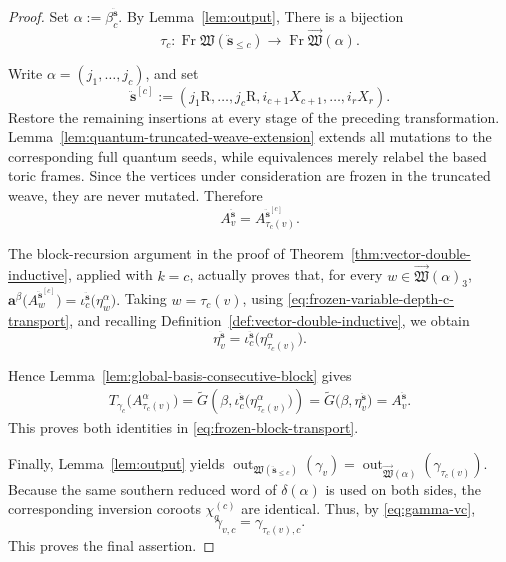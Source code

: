 \documentclass[12pt, reqno]{amsart}
\theoremstyle{plain}
\theoremstyle{definition}
\numberwithin{equation}{section}
\begin{document}
\begin{proof}
Set
\(
    \alpha:=\beta_c^{\ddot{\mathbf s}}.
\)
By Lemma~\ref{lem:output}, There is a bijection
\[
    \tau_c\colon
    \operatorname{Fr}\mathfrak W(\ddot{\mathbf s}_{\leq c})
    \longrightarrow
    \operatorname{Fr}\overrightarrow{\mathfrak W}(\alpha).
\]


Write \(\alpha=(j_1,\ldots,j_c)\), and set
\[
    \ddot{\mathbf s}^{[c]}
    :=
    (j_1\mathrm R,\ldots,j_c\mathrm R,
      i_{c+1}X_{c+1},\ldots,i_rX_r).
\]
Restore the remaining insertions at every stage of the preceding
transformation. Lemma~\ref{lem:quantum-truncated-weave-extension}
extends all mutations to the corresponding full quantum seeds,
while equivalences merely relabel the based toric frames. Since the
vertices under consideration are frozen in the truncated weave,
they are never mutated. Therefore
\begin{equation}\label{eq:frozen-variable-depth-c-transport}
    A_v^{\ddot{\mathbf s}}
    =
    A_{\tau_c(v)}^{\ddot{\mathbf s}^{[c]}}.
\end{equation}

The block-recursion argument in the proof of
Theorem~\ref{thm:vector-double-inductive}, applied with \(k=c\),
actually proves that, for every
\(w\in\overrightarrow{\mathfrak W}(\alpha)_3\),
\(    \mathbf a^\beta
       \bigl(A_w^{\ddot{\mathbf s}^{[c]}}\bigr)
    =
    \iota_c^{\ddot{\mathbf s}}
       \bigl(\eta_w^\alpha\bigr).
\)
Taking \(w=\tau_c(v)\), using
\eqref{eq:frozen-variable-depth-c-transport}, and recalling
Definition~\ref{def:vector-double-inductive}, we obtain
\[
    \eta_v^{\ddot{\mathbf s}}
    =
    \iota_c^{\ddot{\mathbf s}}
       \bigl(\eta_{\tau_c(v)}^\alpha\bigr).
\]

Hence Lemma~\ref{lem:global-basis-consecutive-block} gives
\[
\begin{aligned}
    T_{\gamma_c}
       \bigl(A_{\tau_c(v)}^\alpha\bigr)
    =
    \widetilde G\left(
       \beta,
       \iota_c^{\ddot{\mathbf s}}
          \bigl(\eta_{\tau_c(v)}^\alpha\bigr)
    \right)
    =
    \widetilde G
       \bigl(\beta,\eta_v^{\ddot{\mathbf s}}\bigr)
     =
    A_v^{\ddot{\mathbf s}}.
\end{aligned}
\]
This proves both identities in
\eqref{eq:frozen-block-transport}.

Finally, Lemma~\ref{lem:output} yields
\(
 \operatorname{out}_{\mathfrak W(\ddot{\mathbf s}_{\leq c})}
     (\gamma_v)
 =
 \operatorname{out}_{\overrightarrow{\mathfrak W}(\alpha)}
     (\gamma_{\tau_c(v)}).
\)
Because the same southern reduced word of \(\delta(\alpha)\) is used
on both sides, the corresponding inversion coroots
\(\chi_a^{(c)}\) are identical. Thus, by
\eqref{eq:gamma-vc},
\[
    \gamma_{v,c}
    =
    \gamma_{\tau_c(v),c}.
\]
This proves the final assertion.
\end{proof}
\end{document}
